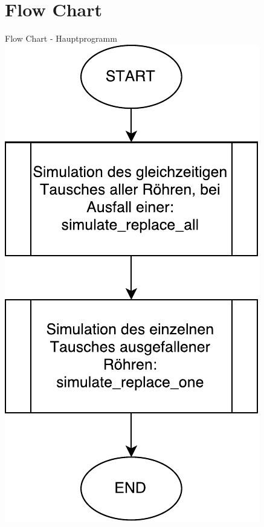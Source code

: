 \section{Flow Chart}
\begin{frame}{Flow Chart - Hauptprogramm}
	\centering
  	\includegraphics[scale=0.4]{BSP20_Flow_Chart.pdf}
\end{frame}

